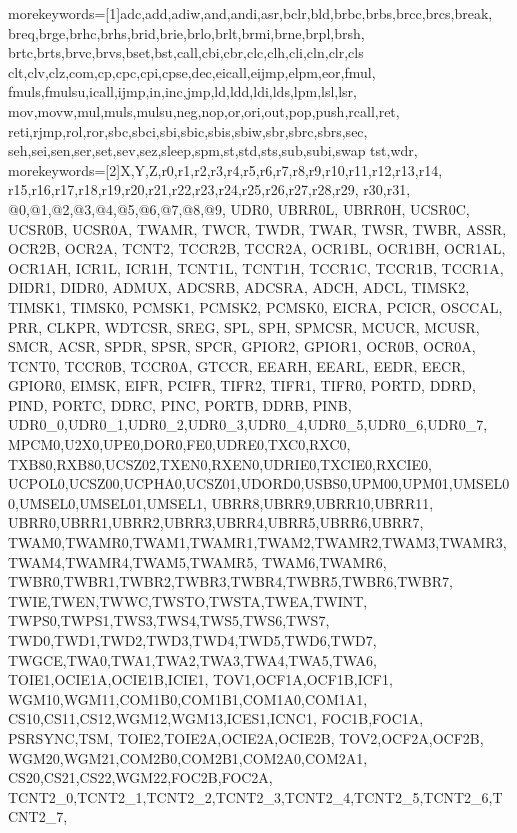   {morekeywords=[1]{adc,add,adiw,and,andi,asr,bclr,bld,brbc,brbs,brcc,brcs,break,
   					breq,brge,brhc,brhs,brid,brie,brlo,brlt,brmi,brne,brpl,brsh,
                    brtc,brts,brvc,brvs,bset,bst,call,cbi,cbr,clc,clh,cli,cln,clr,cls
                    clt,clv,clz,com,cp,cpc,cpi,cpse,dec,eicall,eijmp,elpm,eor,fmul,
                    fmuls,fmulsu,icall,ijmp,in,inc,jmp,ld,ldd,ldi,lds,lpm,lsl,lsr,
                    mov,movw,mul,muls,mulsu,neg,nop,or,ori,out,pop,push,rcall,ret,
                    reti,rjmp,rol,ror,sbc,sbci,sbi,sbic,sbis,sbiw,sbr,sbrc,sbrs,sec,
                    seh,sei,sen,ser,set,sev,sez,sleep,spm,st,std,sts,sub,subi,swap
                    tst,wdr},%
 morekeywords=[2]{X,Y,Z,r0,r1,r2,r3,r4,r5,r6,r7,r8,r9,r10,r11,r12,r13,r14,
                r15,r16,r17,r18,r19,r20,r21,r22,r23,r24,r25,r26,r27,r28,r29,
                r30,r31,
                @0,@1,@2,@3,@4,@5,@6,@7,@8,@9,
                 UDR0, UBRR0L, UBRR0H, UCSR0C, UCSR0B, UCSR0A, TWAMR, TWCR, TWDR,
				TWAR, TWSR, TWBR, ASSR, OCR2B, OCR2A, TCNT2, TCCR2B, TCCR2A, OCR1BL,
				OCR1BH, OCR1AL, OCR1AH, ICR1L, ICR1H, TCNT1L, TCNT1H, TCCR1C, TCCR1B,
				TCCR1A, DIDR1, DIDR0, ADMUX, ADCSRB, ADCSRA, ADCH, ADCL, TIMSK2,
				TIMSK1, TIMSK0, PCMSK1, PCMSK2, PCMSK0, EICRA, PCICR, OSCCAL, PRR,
				CLKPR, WDTCSR, SREG, SPL, SPH, SPMCSR, MCUCR, MCUSR, SMCR, ACSR, 
				SPDR, SPSR, SPCR, GPIOR2, GPIOR1, OCR0B, OCR0A, TCNT0, TCCR0B, TCCR0A,
				GTCCR, EEARH, EEARL, EEDR, EECR, GPIOR0, EIMSK, EIFR, PCIFR, TIFR2,
				TIFR1, TIFR0, PORTD, DDRD, PIND, PORTC, DDRC, PINC, PORTB, DDRB, PINB,
   				 UDR0_0,UDR0_1,UDR0_2,UDR0_3,UDR0_4,UDR0_5,UDR0_6,UDR0_7,
				MPCM0,U2X0,UPE0,DOR0,FE0,UDRE0,TXC0,RXC0,
				TXB80,RXB80,UCSZ02,TXEN0,RXEN0,UDRIE0,TXCIE0,RXCIE0,
				UCPOL0,UCSZ00,UCPHA0,UCSZ01,UDORD0,USBS0,UPM00,UPM01,UMSEL00,UMSEL0,UMSEL01,UMSEL1,
				UBRR8,UBRR9,UBRR10,UBRR11,
				UBRR0,UBRR1,UBRR2,UBRR3,UBRR4,UBRR5,UBRR6,UBRR7,
				TWAM0,TWAMR0,TWAM1,TWAMR1,TWAM2,TWAMR2,TWAM3,TWAMR3,TWAM4,TWAMR4,TWAM5,TWAMR5,
				TWAM6,TWAMR6,
				TWBR0,TWBR1,TWBR2,TWBR3,TWBR4,TWBR5,TWBR6,TWBR7,
				TWIE,TWEN,TWWC,TWSTO,TWSTA,TWEA,TWINT,
				TWPS0,TWPS1,TWS3,TWS4,TWS5,TWS6,TWS7,
				TWD0,TWD1,TWD2,TWD3,TWD4,TWD5,TWD6,TWD7,
				TWGCE,TWA0,TWA1,TWA2,TWA3,TWA4,TWA5,TWA6,
				TOIE1,OCIE1A,OCIE1B,ICIE1,
				TOV1,OCF1A,OCF1B,ICF1,
				WGM10,WGM11,COM1B0,COM1B1,COM1A0,COM1A1,
				CS10,CS11,CS12,WGM12,WGM13,ICES1,ICNC1,
				FOC1B,FOC1A,
				PSRSYNC,TSM,
				TOIE2,TOIE2A,OCIE2A,OCIE2B,
				TOV2,OCF2A,OCF2B,
				WGM20,WGM21,COM2B0,COM2B1,COM2A0,COM2A1,
				CS20,CS21,CS22,WGM22,FOC2B,FOC2A,
				TCNT2_0,TCNT2_1,TCNT2_2,TCNT2_3,TCNT2_4,TCNT2_5,TCNT2_6,TCNT2_7,
}}
